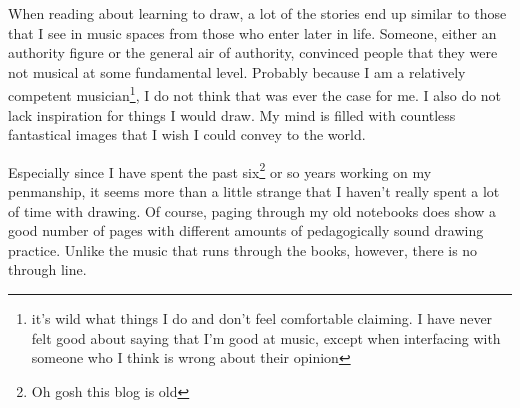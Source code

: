 \documentclass[12pt]{article}[titlepage]
\renewcommand{\,}{\textsuperscript{,}}
\begin{document}
When reading about learning to draw, a lot of the stories end up similar to those that I see in music spaces from those who enter later in life.  
Someone, either an authority figure or the general air of authority, convinced people that they were not musical at some fundamental level.  
Probably because I am a relatively competent musician\footnote{it's wild what things I do and don't feel comfortable claiming. I have never felt good about saying that I'm good at music, except when interfacing with someone who I think is wrong about their opinion}, I do not think that was ever the case for me.  
I also do not lack inspiration for things I would draw.  
My mind is filled with countless fantastical images that I wish I could convey to the world.

Especially since I have spent the past six\footnote{Oh gosh this blog is old} or so years working on my penmanship, it seems more than a little strange that I haven't really spent a lot of time with drawing.  
Of course, paging through my old notebooks does show a good number of pages with different amounts of pedagogically sound drawing practice.  
Unlike the music that runs through the books, however, there is no through line.
\end{document}
